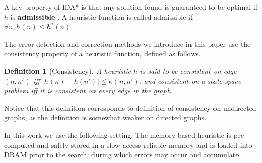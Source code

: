 \documentclass[letterpaper]{article}
\newtheorem{definition}{Definition}
\begin{document}
A key property of IDA* is that any solution found is guaranteed to be optimal if $h$ is \textbf{admissible} \cite{korf85}. A heuristic function is called admissible if $\forall n, h(n) \leq h^*(n)$. 

%



The error detection and correction methods we introduce in this paper use the consistency property of a heuristic function, defined as follows. 

\begin{definition}[Consistency]
A heuristic $h$ is said to be consistent on edge $(n,n')$ iff $|h(n) - h(n')| \le \kappa(n,n')$, and consistent on a state-space problem iff it is consistent on every edge in the graph.
\label{def:consistency}
\end{definition}
Notice that this definition corresponds to definition of consistency on undirected graphs, as the definition is somewhat weaker on directed graphs.

In this work we use the following setting. The memory-based heuristic is pre-computed and safely stored in a slow-access reliable memory and is loaded into DRAM 
prior to the search, during which errors may occur and accumulate.
\end{document}
